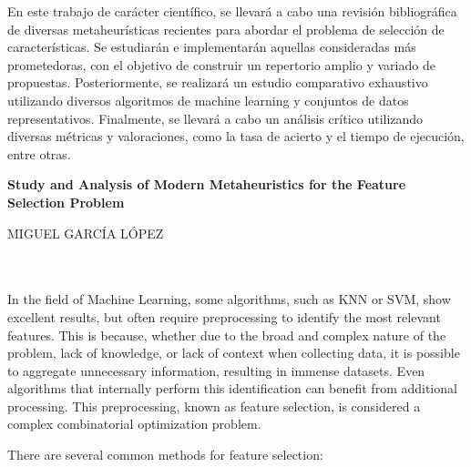 En este trabajo de carácter científico, se llevará a cabo una revisión bibliográfica de diversas metaheurísticas recientes para abordar el problema de selección de características. Se estudiarán e implementarán aquellas consideradas más prometedoras, con el objetivo de construir un repertorio amplio y variado de propuestas. Posteriormente, se realizará un estudio comparativo exhaustivo utilizando diversos algoritmos de machine learning y conjuntos de datos representativos. Finalmente, se llevará a cabo un análisis crítico utilizando diversas métricas y valoraciones, como la tasa de acierto y el tiempo de ejecución, entre otras.
\cleardoublepage


\thispagestyle{empty}


\begin{center}
       {\large\bfseries Study and Analysis of Modern Metaheuristics for the Feature Selection Problem}\\
\end{center}
\begin{center}
       MIGUEL GARCÍA LÓPEZ\\
\end{center}

\\

\vspace{0.7cm}
\\

In the field of Machine Learning, some algorithms, such as KNN or SVM, show excellent results, but often require preprocessing to identify the most relevant features. This is because, whether due to the broad and complex nature of the problem, lack of knowledge, or lack of context when collecting data, it is possible to aggregate unnecessary information, resulting in immense datasets. Even algorithms that internally perform this identification can benefit from additional processing. This preprocessing, known as feature selection, is considered a complex combinatorial optimization problem.

There are several common methods for feature selection:


